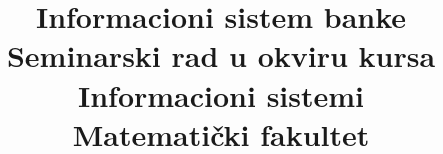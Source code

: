 \documentclass{article}
\begin{document}
\title{Informacioni sistem banke\\ \small{Seminarski rad u okviru kursa\\Informacioni sistemi\\ Matematički fakultet}}
\end{document}

